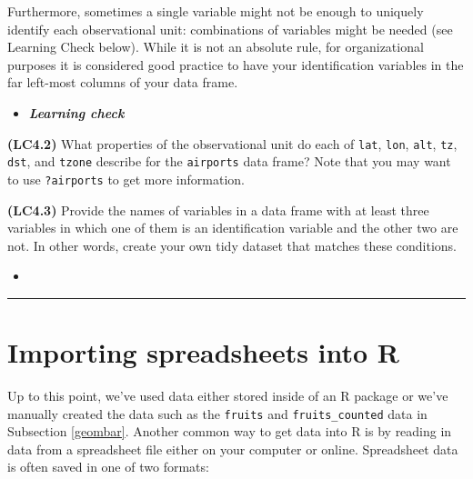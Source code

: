 \documentclass[12pt,]{krantz}
\newenvironment{rmdblock}[1]
  {\begin{shaded*}
  \begin{itemize}
  \renewcommand{\labelitemi}{
    \raisebox{-.7\height}[0pt][0pt]{
    }
  }
  \item
  }
  {
  \end{itemize}
  \end{shaded*}
  }
\newenvironment{learncheck}
  {\begin{rmdblock}{warning}}
  {\end{rmdblock}}
\begin{document}
Furthermore, sometimes a single variable might not be enough to uniquely
identify each observational unit: combinations of variables might be
needed (see Learning Check below). While it is not an absolute rule, for
organizational purposes it is considered good practice to have your
identification variables in the far left-most columns of your data
frame.

\begin{learncheck}
\textbf{\emph{Learning check}}
\end{learncheck}

\textbf{(LC4.2)} What properties of the observational unit do each of
\texttt{lat}, \texttt{lon}, \texttt{alt}, \texttt{tz}, \texttt{dst}, and
\texttt{tzone} describe for the \texttt{airports} data frame? Note that
you may want to use \texttt{?airports} to get more information.

\textbf{(LC4.3)} Provide the names of variables in a data frame with at
least three variables in which one of them is an identification variable
and the other two are not. In other words, create your own tidy dataset
that matches these conditions.

\begin{learncheck}

\end{learncheck}

\begin{center}\rule{0.5\linewidth}{\linethickness}\end{center}

\section{Importing spreadsheets into R}\label{csv}

Up to this point, we've used data either stored inside of an R package
or we've manually created the data such as the \texttt{fruits} and
\texttt{fruits\_counted} data in Subsection \ref{geombar}. Another
common way to get data into R is by reading in data from a spreadsheet
file either on your computer or online. Spreadsheet data is often saved
in one of two formats:
\end{document}
